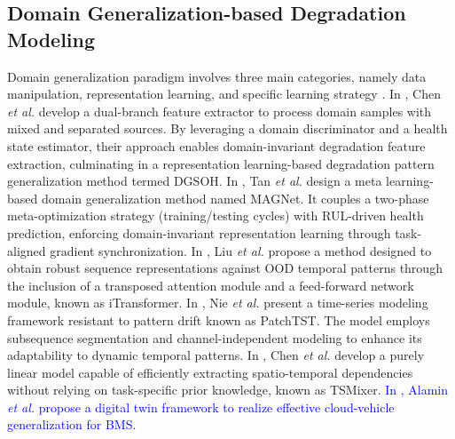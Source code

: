 \documentclass[lettersize,journal]{IEEEtran}
\newcommand{\rev}[1]{\textcolor{blue}{#1}}
\begin{document}
\subsection{Domain Generalization-based Degradation Modeling}

Domain generalization paradigm involves three main categories, namely data manipulation, representation learning, and specific learning strategy \cite{9782500}.
In \cite{CHEN2024234696}, Chen \emph{et al.} develop a dual-branch feature extractor to process domain samples with mixed and separated sources. By leveraging a domain discriminator and a health state estimator, their approach enables domain-invariant degradation feature extraction, culminating in a representation learning-based degradation pattern generalization method termed DGSOH.
In \cite{TAN2024103725}, Tan \emph{et al.} design a meta learning-based domain generalization method named MAGNet. It couples a two-phase meta-optimization strategy (training/testing cycles) with RUL-driven health prediction, enforcing domain-invariant representation learning through task-aligned gradient synchronization. %
In \cite{liu2024itransformer}, Liu \emph{et al.} propose a method designed to obtain robust sequence representations against OOD temporal patterns through the inclusion of a transposed attention module and a feed-forward network module, known as iTransformer.
In \cite{nie2023a}, Nie \emph{et al.} present a time-series modeling framework resistant to pattern drift known as PatchTST. The model employs subsequence segmentation and channel-independent modeling to enhance its adaptability to dynamic temporal patterns.
In \cite{chen2023tsmixer}, Chen \emph{et al.} develop a purely linear model capable of efficiently extracting spatio-temporal dependencies without relying on task-specific prior knowledge, known as TSMixer.
% 
\rev{In \cite{10980357}, Alamin \emph{et al.} propose a digital twin framework to realize effective cloud-vehicle generalization for BMS.}
\end{document}
